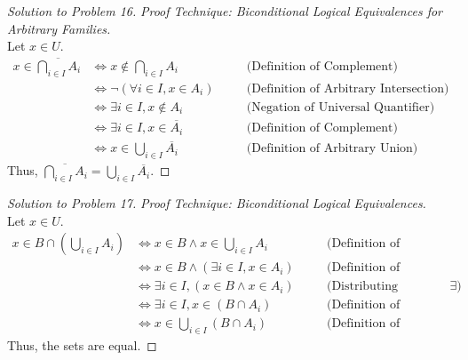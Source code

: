\documentclass[12pt]{article}
\theoremstyle{definition}
\begin{document}
\begin{proof}[Solution to Problem 16]
\textit{Proof Technique: Biconditional Logical Equivalences for Arbitrary Families.} \\
Let $x \in U$.
\begin{align*}
x \in \overline{\bigcap_{i \in I} A_i} &\iff x \notin \bigcap_{i \in I} A_i \quad &&\text{(Definition of Complement)} \\
&\iff \neg\left(\forall i \in I, x \in A_i\right) \quad &&\text{(Definition of Arbitrary Intersection)} \\
&\iff \exists i \in I, x \notin A_i \quad &&\text{(Negation of Universal Quantifier)} \\
&\iff \exists i \in I, x \in \overline{A_i} \quad &&\text{(Definition of Complement)} \\
&\iff x \in \bigcup_{i \in I} \overline{A_i} \quad &&\text{(Definition of Arbitrary Union)}
\end{align*}
Thus, $\overline{\bigcap_{i \in I} A_i} = \bigcup_{i \in I} \overline{A_i}$.
\end{proof}

\begin{proof}[Solution to Problem 17]
\textit{Proof Technique: Biconditional Logical Equivalences.} \\
Let $x \in U$.
\begin{align*}
x \in B \cap \left(\bigcup_{i \in I} A_i\right) &\iff x \in B \land x \in \bigcup_{i \in I} A_i \quad &&\text{(Definition of Intersection)} \\
&\iff x \in B \land (\exists i \in I, x \in A_i) \quad &&\text{(Definition of Arbitrary Union)} \\
&\iff \exists i \in I, (x \in B \land x \in A_i) \quad &&\text{(Distributing independent statement into } \exists \text{)} \\
&\iff \exists i \in I, x \in (B \cap A_i) \quad &&\text{(Definition of Intersection)} \\
&\iff x \in \bigcup_{i \in I} (B \cap A_i) \quad &&\text{(Definition of Arbitrary Union)}
\end{align*}
Thus, the sets are equal.
\end{proof}
\end{document}

